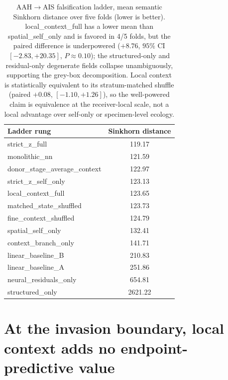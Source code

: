 \begin{table}[htbp]
  \centering
  \caption[AAH$\rightarrow$AIS falsification ladder]{AAH$\rightarrow$AIS falsification ladder, mean semantic Sinkhorn distance over five folds (lower is better). local\_context\_full has a lower mean than spatial\_self\_only and is favored in 4/5 folds, but the paired difference is underpowered ($+8.76$, $95\%$ CI $[-2.83, +20.35]$, $P \approx 0.10$); the structured-only and residual-only degenerate fields collapse unambiguously, supporting the grey-box decomposition. Local context is statistically equivalent to its stratum-matched shuffle (paired $+0.08$, $[-1.10,+1.26]$), so the well-powered claim is equivalence at the receiver-local scale, not a local advantage over self-only or specimen-level ecology.}
  \label{tab:ladder}
  \begin{tabular}{lc}
    \toprule
    Ladder rung & Sinkhorn distance \\
    \midrule
    strict\_z\_full               & 119.17 \\
    monolithic\_nn                & 121.59 \\
    donor\_stage\_average\_context & 122.97 \\
    strict\_z\_self\_only          & 123.13 \\
    local\_context\_full          & 123.65 \\
    matched\_state\_shuffled       & 123.73 \\
    fine\_context\_shuffled        & 124.79 \\
    spatial\_self\_only            & 132.41 \\
    context\_branch\_only          & 141.71 \\
    linear\_baseline\_B            & 210.83 \\
    linear\_baseline\_A            & 251.86 \\
    neural\_residuals\_only        & 654.81 \\
    structured\_only              & 2621.22 \\
    \bottomrule
  \end{tabular}
\end{table}

\section{At the invasion boundary, local context adds no endpoint-predictive value}
\label{sec:invasion-ladder}

